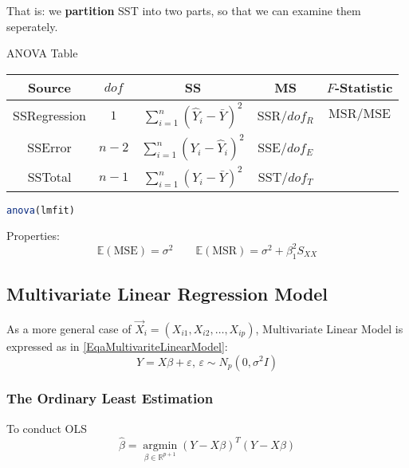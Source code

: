     That is: we \textbf{partition} SST into two parts, so that we can examine them seperately.
    

    \begin{point}
        ANOVA Table
    \end{point}
    
        \begin{table}[H]
            \centering
            \renewcommand\arraystretch{1}
            \begin{tabular}{c|cccc}
                \hline
                Source&$ dof $&SS&MS&$ F $-Statistic\\\hline
                SSRegression&$ 1 $&$ \sum_{i=1}^n(\hat{Y}_i-\bar{Y})^2  $&SSR/$ dof_R $& $ \mathrm{MSR}/\mathrm{MSE} $\\
                SSError&$ n-2 $&$ \sum_{i=1}^n(Y_i-\hat{Y}_i)^2  $&SSE/$ dof_E $& \\
                SSTotal&$ n-1 $&$ \sum_{i=1}^n(Y_i-\bar{Y})^2  $&SST/$ dof_T $& \\
                \hline
            \end{tabular}
        \end{table}
    \begin{rcode}
\begin{lstlisting}[language=R]
anova(lmfit)
\end{lstlisting}
    \end{rcode}    





Properties:
\begin{equation}
    \mathbb{E}(\mathrm{MSE})=\sigma ^2\qquad \mathbb{E}(\mathrm{MSR})=\sigma ^2+\beta _1^2S_{XX} 
\end{equation}



\subsection{Multivariate Linear Regression Model}\label{SubSectionMultivariateLinearRegressionModel}
    As a more general case of $ \vec{X}_i=(X_{i1},X_{i2},\ldots,X_{ip})  $, Multivariate Linear Model is expressed as in \autoref{EqaMultivariteLinearModel}:
    \begin{equation}
        Y=X\beta +\varepsilon ,\,\varepsilon \sim N_p(0,\sigma ^2I) 
    \end{equation}


\subsubsection{The Ordinary Least Estimation}
    To conduct OLS
    \begin{equation}
        \hat{\beta }=\mathop{ \arg\min }\limits_{\beta \in \mathbb{R}^{p+1} } (Y-X\beta )^T(Y-X\beta )
    \end{equation}
    
